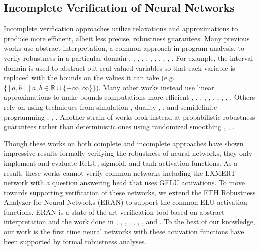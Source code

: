 \documentclass{llncs}
\begin{document}
\subsection{Incomplete Verification of Neural Networks}
Incomplete verification approaches utilize relaxations and approximations to produce more efficient, albeit less precise, robustness guarantees.
Many previous works use abstract interpretation, a common approach in program analysis, to verify robustness in a particular domain \cite{gehr2018ai2}, \cite{singh2018fast}, \cite{singh2019abstract}, \cite{li2019analyzing}, \cite{urban2020perfectly}, \cite{muller2021scaling}, \cite{muller2022prima}, \cite{zhang2020verification}, \cite{mirman2018differentiable}, \cite{muller2020neural}, \cite{singh2019beyond}.
For example, the interval domain is used to abstract out real-valued variables so that each variable is replaced with the bounds on the values it can take (e.g. $\{[a,b] \; | \; a,b \in \mathbb{R} \cup \{-\infty, \infty\}\}$).
Many other works instead use linear approximations to make bounds computations more efficient \cite{weng2018towards}, \cite{singh2018boosting}, \cite{zhang2018efficient}, \cite{balunovic2019certifying}, \cite{ruoss2020efficient}, \cite{ko2019popqorn}, \cite{gowal2019scalable}, \cite{bunel2020efficient}, \cite{lyu2020fastened}, \cite{tjandraatmadja2020convex}.
Others rely on using techniques from simulation \cite{xiang2018output}, duality \cite{wong2018provable}, \cite{dvijotham2018dual}, and semidefinite programming \cite{raghunathan2018certified}, \cite{dathathri2020enabling}, \cite{raghunathan2018semidefinite}.
Another strain of works look instead at probabilistic robustness guarantees rather than deterministic ones using randomized smoothing \cite{cohen2019certified}, \cite{lecuyer2019certified}, \cite{salman2019provably}.

Though these works on both complete and incomplete approaches have shown impressive results formally verifying the robustness of neural networks, they only implement and evaluate ReLU, sigmoid, and tanh activation functions.
As a result, these works cannot verify common networks including the LXMERT network with a question answering head that uses GELU \cite{GELU} activations.
To move towards supporting verification of these networks, we extend the ETH Robustness Analyzer for Neural Networks (ERAN) \cite{ERAN} to support the common ELU \cite{ELU} activation functions.
ERAN is a state-of-the-art verification tool based on abstract interpretation and the work done in \cite{singh2018fast}, \cite{singh2019abstract}, \cite{singh2018boosting}, \cite{singh2019beyond}, \cite{balunovic2019certifying}, \cite{ruoss2020efficient}, \cite{muller2021scaling}, and \cite{muller2022prima}.
To the best of our knowledge, our work is the first time neural networks with these activation functions have been supported by formal robustness analyses.
\end{document}
